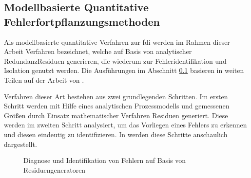 \subsection{Modellbasierte Quantitative Fehlerfortpflanzungsmethoden}\label{sec:fAna_modQuant}
Als modellbasierte quantitative Verfahren zur \ac{fdi} werden im Rahmen dieser Arbeit Verfahren bezeichnet, welche auf Basis von \glqq analytischer Redundanz\grqq { }Residuen generieren, die wiederum zur Fehleridentifikation und Isolation genutzt werden. Die Ausf\"uhrungen im Abschnitt \ref{sec:fAna_modQuant} basieren in weiten Teilen auf der Arbeit von \citeauthor{Venkatasubramanian_2003} \cite{Venkatasubramanian_2003}. 

Verfahren dieser Art bestehen aus zwei grundlegenden Schritten. Im ersten Schritt werden mit Hilfe eines analytischen Prozessmodells und gemessenen Gr\"o\ss{}en durch Einsatz mathematischer Verfahren Residuen generiert. Diese werden im zweiten Schritt analysiert, um das Vorliegen eines Fehlers zu erkennen und diesen eindeutig zu identifizieren. In  werden diese Schritte anschaulich dargestellt.

\begin{figure}[h!tb]
\centering
	
	\caption[Fehleridentifikation mit Residuen]{Diagnose und Identifikation von Fehlern auf Basis von Residuengeneratoren}
	\label{fig:fAna_fidResiduen}
\end{figure}


